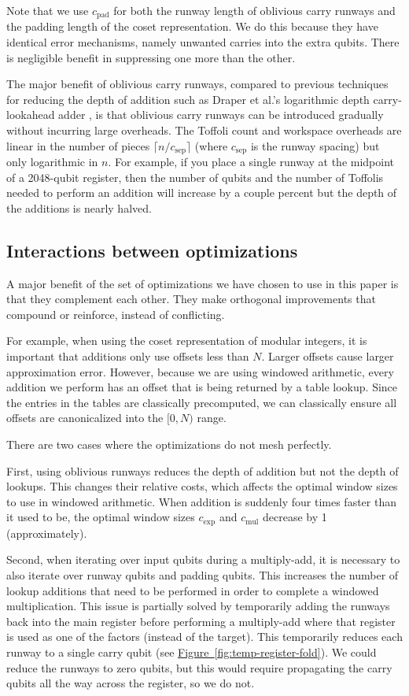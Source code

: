 \documentclass[superscriptaddress,notitlepage,longbibliography]{revtex4-1}
\theoremstyle{definition}
\theoremstyle{definition}
\newcommand{\fig}[1]{\hyperref[fig:#1]{Figure~\ref*{fig:#1}}}
\newcommand{\gexp}{{c_{\text{exp}}}}
\newcommand{\gmul}{{c_{\text{mul}}}}
\newcommand{\gsep}{{c_{\text{sep}}}}
\newcommand{\gpad}{{c_{\text{pad}}}}
\begin{document}
Note that we use $\gpad$ for both the runway length of oblivious carry runways and the padding length of the coset representation.
We do this because they have identical error mechanisms, namely unwanted carries into the extra qubits.
There is negligible benefit in suppressing one more than the other.

The major benefit of oblivious carry runways, compared to previous techniques for reducing the depth of addition such as Draper et al.'s logarithmic depth carry-lookahead adder \cite{draper2004logarithmic}, is that oblivious carry runways can be introduced gradually without incurring large overheads.
The Toffoli count and workspace overheads are linear in the number of pieces $\lceil n/\gsep\rceil$ (where $\gsep$ is the runway spacing) but only logarithmic in $n$.
For example, if you place a single runway at the midpoint of a 2048-qubit register, then the number of qubits and the number of Toffolis needed to perform an addition will increase by a couple percent but the depth of the additions is nearly halved.

\subsection{Interactions between optimizations}

A major benefit of the set of optimizations we have chosen to use in this paper is that they complement each other.
They make orthogonal improvements that compound or reinforce, instead of conflicting.

For example, when using the coset representation of modular integers, it is important that additions only use offsets less than $N$.
Larger offsets cause larger approximation error.
However, because we are using windowed arithmetic, every addition we perform has an offset that is being returned by a table lookup.
Since the entries in the tables are classically precomputed, we can classically ensure all offsets are canonicalized into the $[0, N)$ range.

There are two cases where the optimizations do not mesh perfectly.

First, using oblivious runways reduces the depth of addition but not the depth of lookups.
This changes their relative costs, which affects the optimal window sizes to use in windowed arithmetic.
When addition is suddenly four times faster than it used to be, the optimal window sizes $\gexp$ and $\gmul$ decrease by 1 (approximately).

Second, when iterating over input qubits during a multiply-add, it is necessary to also iterate over runway qubits and padding qubits.
This increases the number of lookup additions that need to be performed in order to complete a windowed multiplication.
This issue is partially solved by temporarily adding the runways back into the main register before performing a multiply-add where that register is used as one of the factors (instead of the target).
This temporarily reduces each runway to a single carry qubit (see \fig{temp-register-fold}).
We could reduce the runways to zero qubits, but this would require propagating the carry qubits all the way across the register, so we do not.
\end{document}
